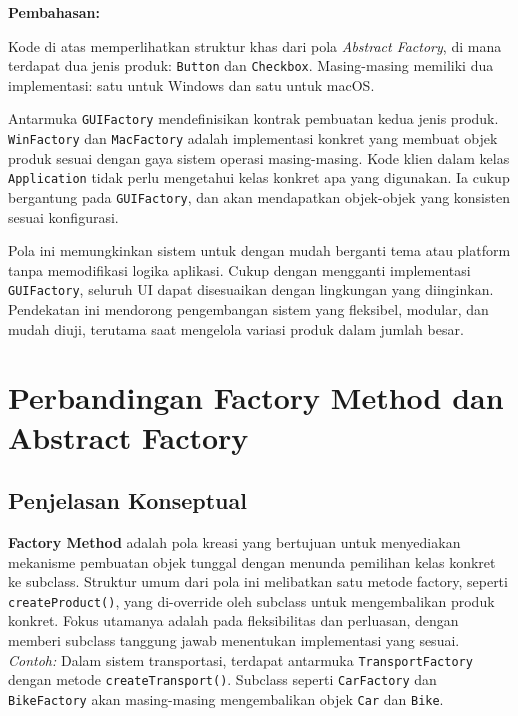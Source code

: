 \textbf{Pembahasan:}

Kode di atas memperlihatkan struktur khas dari pola \textit{Abstract Factory}, di mana terdapat dua jenis produk: \texttt{Button} dan \texttt{Checkbox}. Masing-masing memiliki dua implementasi: satu untuk Windows dan satu untuk macOS.

Antarmuka \texttt{GUIFactory} mendefinisikan kontrak pembuatan kedua jenis produk. \texttt{WinFactory} dan \texttt{MacFactory} adalah implementasi konkret yang membuat objek produk sesuai dengan gaya sistem operasi masing-masing. Kode klien dalam kelas \texttt{Application} tidak perlu mengetahui kelas konkret apa yang digunakan. Ia cukup bergantung pada \texttt{GUIFactory}, dan akan mendapatkan objek-objek yang konsisten sesuai konfigurasi.

Pola ini memungkinkan sistem untuk dengan mudah berganti tema atau platform tanpa memodifikasi logika aplikasi. Cukup dengan mengganti implementasi \texttt{GUIFactory}, seluruh UI dapat disesuaikan dengan lingkungan yang diinginkan. Pendekatan ini mendorong pengembangan sistem yang fleksibel, modular, dan mudah diuji, terutama saat mengelola variasi produk dalam jumlah besar.

\section{Perbandingan Factory Method dan Abstract Factory}

\subsection{Penjelasan Konseptual}

\textbf{Factory Method} adalah pola kreasi yang bertujuan untuk menyediakan mekanisme pembuatan objek tunggal dengan menunda pemilihan kelas konkret ke subclass. Struktur umum dari pola ini melibatkan satu metode factory, seperti \texttt{createProduct()}, yang di-override oleh subclass untuk mengembalikan produk konkret. Fokus utamanya adalah pada fleksibilitas dan perluasan, dengan memberi subclass tanggung jawab menentukan implementasi yang sesuai.\\
\textit{Contoh:} Dalam sistem transportasi, terdapat antarmuka \texttt{TransportFactory} dengan metode \texttt{createTransport()}. Subclass seperti \texttt{CarFactory} dan \texttt{BikeFactory} akan masing-masing mengembalikan objek \texttt{Car} dan \texttt{Bike}.

